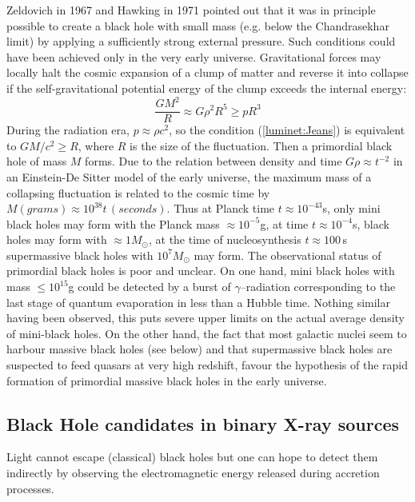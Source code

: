 \documentclass{lamuphys}
\begin{document}
Zeldovich in 1967 and Hawking in 1971 pointed out that it was in principle 
possible to create a
black hole with small mass (e.g. below the Chandrasekhar limit) by applying 
a sufficiently strong external
pressure. Such conditions could have been achieved only in the very early universe. 
Gravitational forces may locally halt the cosmic expansion of a clump of 
matter and reverse it
into collapse if the self-gravitational potential energy of the clump exceeds the internal
energy:
\begin{equation}
\frac{GM^2}{R}  \approx G\rho ^2 R^5 \geq pR^3 \label{luminet:Jeans}
\end{equation}
 During the radiation era, $p \approx
\rho c^2$, so the condition (\ref{luminet:Jeans}) is equivalent 
to $GM/c^2 \geq R$, where $R$ is the size of the fluctuation. Then a primordial 
black hole of mass $M$
forms. Due to the relation between density and time $G\rho \approx t^{-2}$ in 
an Einstein-De Sitter model 
of the early universe, the maximum mass of a
collapsing fluctuation is related to the cosmic time by $M(grams) \approx 
10^{38} t \,(seconds)$. 
Thus at Planck time $t \approx 10^{-43}$s, only mini black holes may form with the Planck mass
$\approx 10^{-5}$g, at time $t  \approx 10^{-4}$s, black holes may form with
$\approx 1 M_{\odot}$, at the time of nucleosynthesis $t \approx 100 
\,$s supermassive
black holes with $10^7 M_{\odot}$ may form.
The observational status of primordial black holes is poor and 
unclear. On one hand, mini black holes with mass $\leq 10^{15}$g could be detected by a burst of
$\gamma$--radiation corresponding to the last stage of quantum evaporation in less than a
Hubble time. Nothing similar having been observed, this puts severe upper limits on the actual
average density of mini-black holes. On the other hand, the fact that most 
galactic nuclei seem to harbour massive black holes (see below) and that 
supermassive black holes are suspected to feed
quasars at very high redshift, favour the hypothesis of the rapid formation 
of primordial massive black holes in
the early universe.

\subsection {Black Hole candidates in binary X-ray sources}

Light cannot escape (classical) black holes but one can hope to detect 
them indirectly by observing the electromagnetic energy released 
during accretion processes.
\end{document}

